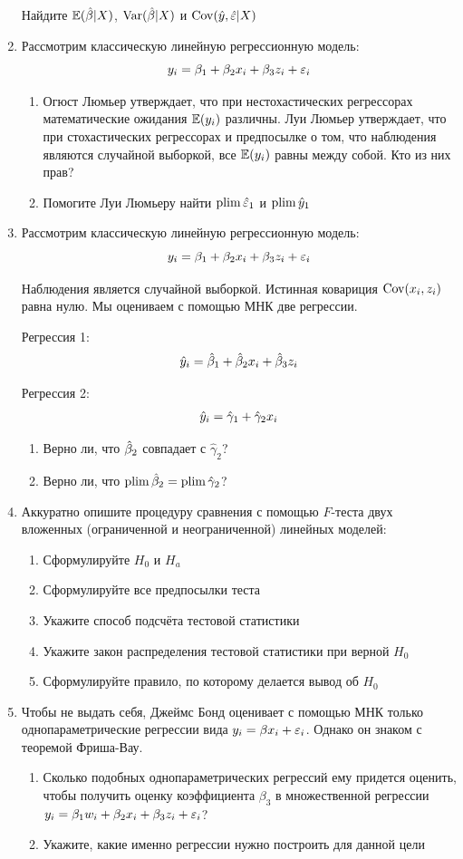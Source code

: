 \documentclass[12pt, a4paper]{article}
\begin{document}
\begin{enumerate}
Найдите $\mathbb{E}(\hat{\beta}|X)$, $\operatorname{Var}(\hat{\beta}|X)$ и $\operatorname{Cov}(\hat{y}, \hat{\varepsilon} | X)$

\item Рассмотрим классическую линейную регрессионную модель:
\[
y_i = \beta_1 + \beta_2 x_i + \beta_3 z_i + \varepsilon_i
\]

\begin{enumerate}
\item Огюст Люмьер утверждает, что при нестохастических регрессорах математические ожидания $\mathbb{E}(y_i)$ различны. Луи Люмьер утверждает, что при стохастических регрессорах и предпосылке о том, что наблюдения являются случайной выборкой, все $\mathbb{E}(y_i)$ равны между собой. Кто из них прав?
\item Помогите Луи Люмьеру найти $\operatorname*{plim} \hat{\varepsilon}_1$ и $\operatorname*{plim} \hat{y}_1$
\end{enumerate}


\item Рассмотрим классическую линейную регрессионную модель:
\[
y_i = \beta_1 + \beta_2 x_i + \beta_3 z_i + \varepsilon_i
\]

Наблюдения является случайной выборкой. Истинная ковариция $\operatorname{Cov}(x_i, z_i)$ равна нулю. Мы оцениваем с помощью МНК две регрессии.

Регрессия 1:
\[
\hat{y}_i = \hat{\beta}_1 + \hat{\beta}_2 x_i + \hat{\beta}_3 z_i
\]

Регрессия 2:
\[
\hat{y}_i = \hat \gamma_1 + \hat \gamma_2 x_i
\]

\begin{enumerate}
\item Верно ли, что $\hat{\beta}_2$ совпадает с $\hat \gamma_2$?
\item Верно ли, что $\operatorname*{plim} \hat{\beta}_2 = \operatorname*{plim} \hat \gamma_2$?
\end{enumerate}


\item Аккуратно опишите процедуру сравнения с помощью $F$-теста двух вложенных (ограниченной и неограниченной) линейных моделей:
\begin{enumerate}
\item Сформулируйте $H_0$ и $H_a$
\item Сформулируйте все предпосылки теста
\item Укажите способ подсчёта тестовой статистики
\item Укажите закон распределения тестовой статистики при верной $H_0$
\item Сформулируйте правило, по которому делается вывод об $H_0$
\end{enumerate}

\item Чтобы не выдать себя, Джеймс Бонд оценивает с помощью МНК только однопараметрические регрессии вида $y_i=\beta x_i + \varepsilon_i$. Однако он знаком с теоремой Фриша-Вау.
\begin{enumerate}
\item Сколько подобных однопараметрических регрессий ему придется оценить, чтобы получить оценку коэффициента $\beta_3$ в множественной регрессии $y_i = \beta_1 w_i + \beta_2 x_i + \beta_3 z_i + \varepsilon_i$?
\item Укажите, какие именно регрессии нужно построить для данной цели
\end{enumerate}

\end{enumerate}
\end{document}
